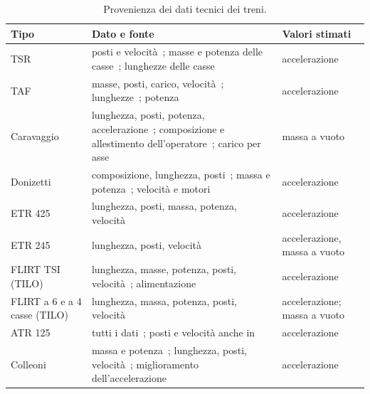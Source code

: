 \begin{table}[H]
	\centering
	\caption{Provenienza dei dati tecnici dei treni.}
	\label{tab:dati-treni}
	\small
	\begin{tabularx}{\textwidth}{l>{\raggedright\arraybackslash}X>{\raggedright\arraybackslash}p{}}
		\toprule
		Tipo & Dato e fonte & Valori stimati \\
		\midrule
		TSR & posti e velocità~\cite{trenord_flotta}; masse e potenza delle casse~\cite{wiki_tsr,scalaenne_tsr}; lunghezze delle casse~\cite{scalaenne_tsr} & accelerazione \\
		TAF & masse, posti, carico, velocità~\cite{rfi2005taf}; lunghezze~\cite{scalaenne_taf}; potenza~\cite{wiki_taf} & accelerazione \\
		Caravaggio & lunghezza, posti, potenza, accelerazione~\cite{wiki_caravaggio}; composizione e allestimento dell'operatore~\cite{fantini2021caravaggio}; carico per asse~\cite{scalaenne_caravaggio} & massa a vuoto \\
		Donizetti & composizione, lunghezza, posti~\cite{fantini2021caravaggio}; massa e potenza~\cite{wiki_pop}; velocità e motori~\cite{trenitalia2017pop} & accelerazione \\
		ETR 425 & lunghezza, posti, massa, potenza, velocità~\cite{wiki_coradia} & accelerazione \\
		ETR 245 & lunghezza, posti, velocità~\cite{trenord_flotta} & accelerazione, massa a vuoto \\
		FLIRT TSI (TILO) & lunghezza, masse, potenza, posti, velocità~\cite{trainswiss_rabe524}; alimentazione~\cite{railwaygazette_tilo} & accelerazione \\
		FLIRT a 6 e a 4 casse (TILO) & lunghezza, massa, potenza, posti, velocità~\cite{trainswiss_rabde524} & accelerazione; massa a vuoto \\
		ATR 125 & tutti i dati~\cite{stadler_gtw}; posti e velocità anche in~\cite{trenord_flotta} & accelerazione \\
		Colleoni & massa e potenza~\cite{railvolution_atr803}; lunghezza, posti, velocità~\cite{wiki_atr803}; miglioramento dell'accelerazione~\cite{trenord_flotta} & accelerazione \\
		\bottomrule
	\end{tabularx}
\end{table}

